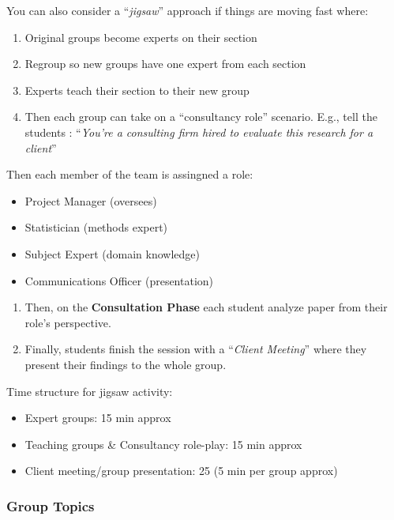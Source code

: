 \documentclass[
  letterpaper,
  DIV=11,
  numbers=noendperiod]{scrartcl}
\providecommand{\tightlist}{%
  \setlength{\itemsep}{0pt}\setlength{\parskip}{0pt}}\usepackage{longtable,booktabs,array}
\begin{document}
You can also consider a ``\emph{jigsaw}'' approach if things are moving
fast where:

\begin{enumerate}
\def\labelenumi{\arabic{enumi}.}
\item
  Original groups become experts on their section
\item
  Regroup so new groups have one expert from each section
\item
  Experts teach their section to their new group
\item
  Then each group can take on a ``consultancy role'' scenario. E.g.,
  tell the students : ``\emph{You're a consulting firm hired to evaluate
  this research for a client}''
\end{enumerate}

Then each member of the team is assingned a role:

\begin{itemize}
\item
  Project Manager (oversees)
\item
  Statistician (methods expert)
\item
  Subject Expert (domain knowledge)
\item
  Communications Officer (presentation)
\end{itemize}

\begin{enumerate}
\def\labelenumi{\arabic{enumi}.}
\setcounter{enumi}{4}
\tightlist
\item
  Then, on the \textbf{Consultation Phase} each student analyze paper
  from their role's perspective.
\item
  Finally, students finish the session with a ``\emph{Client Meeting}''
  where they present their findings to the whole group.
\end{enumerate}

Time structure for jigsaw activity:

\begin{itemize}
\item
  Expert groups: 15 min approx
\item
  Teaching groups \& Consultancy role-play: 15 min approx
\item
  Client meeting/group presentation: 25 (5 min per group approx)
\end{itemize}

\subsubsection{Group Topics}\label{group-topics}
\end{document}
